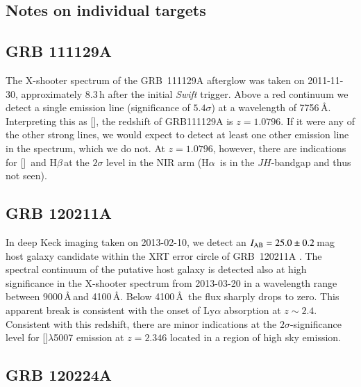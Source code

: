 \documentclass[traditabstract, longauth]{aa}
\newcommand{\hb}{H$\beta$}
\newcommand{\ha}{H$\alpha$}
\newcommand{\oii}{[\ion{O}{ii}]}
\newcommand{\oiii}{[\ion{O}{iii}]}
\begin{document}


\begin{appendix}

\section{Notes on individual targets}
\label{app:newz}

\subsection{GRB 111129A}

The X-shooter spectrum of the GRB~111129A afterglow \citep{2011GCN..12600...1R} was taken on 2011-11-30, approximately 8.3\,h after the initial \textit{Swift} trigger. Above a red continuum \citep{2011GCN..12605...1R} we detect a single emission line (significance of $5.4\sigma$) at a wavelength of 7756\,\AA. Interpreting this as \oii, the redshift of GRB111129A is $z=1.0796$. If it were any of the other strong lines, we would expect to detect at least one other emission line in the spectrum, which we do not. At $z=1.0796$, however, there are indications for \oiii\, and \hb\,at the $2\sigma$ level in the NIR arm (\ha\, is in the $JH$-bandgap and thus not seen).

\subsection{GRB 120211A}

In deep Keck imaging taken on 2013-02-10, we detect an $I_{\rm{AB}}=25.0\pm0.2$\,mag host galaxy candidate within the XRT error circle \citep{2012GCN..12922...1G} of GRB~120211A \citep{2012GCN..12920...1S}. The spectral continuum of the putative host galaxy is detected also at high significance in the X-shooter spectrum from 2013-03-20 in a wavelength range between 9000\,\AA\,and 4100\,\AA. Below 4100\,\AA\, the flux sharply drops to zero. This apparent break is consistent with the onset of Ly$\alpha$ absorption at $z\sim2.4$. Consistent with this redshift, there are minor indications at the $2\sigma$-significance level for \oiii$\lambda$5007 emission at $z=2.346$ located in a region of high sky emission.

\subsection{GRB 120224A}


\end{appendix}
\end{document}
